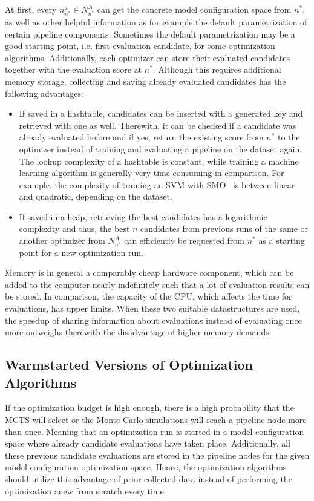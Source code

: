 At first, every $n^{a}_{n^*} \in N^A_{n^*}$ can get the concrete model configuration space from $n^*$, as well as other helpful information as for example the default parametrization of certain pipeline components.
Sometimes the default parametrization may be a good starting point, i.e. first evaluation candidate, for some optimization algorithms.\newline
Additionally, each optimizer can store their evaluated candidates together with the evaluation score at $n^*$.
Although this requires additional memory storage, collecting and saving already evaluated candidates has the following advantages:
\begin{itemize}
    \item If saved in a hashtable, candidates can be inserted with a generated key and retrieved with one as well. Therewith, it can be checked if a candidate was already evaluated before and if yes, return the existing score from $n^*$ to the optimizer instead of training and evaluating a pipeline on the dataset again.
    The lookup complexity of a hashtable is constant, while training a machine learning algorithm is generally very time consuming in comparison.
    For example, the complexity of training an SVM with SMO~\cite{Platt-SMO} is between linear and quadratic, depending on the dataset.
    \item If saved in a heap, retrieving the best candidates has a logarithmic complexity and thus, the best $n$ candidates from previous runs of the same or another optimizer from $N^A_{n^*}$ can efficiently be requested from $n^*$ as a starting point for a new optimization run.
\end{itemize}
Memory is in general a comparably cheap hardware component, which can be added to the computer nearly indefinitely such that a lot of evaluation results can be stored.
In comparison, the capacity of the CPU, which affects the time for evaluations, has upper limits.
When these two suitable datastructures are used, the speedup of sharing information about evaluations instead of evaluating once more outweighs therewith the disadvantage of higher memory demands.

\subsection{Warmstarted Versions of Optimization Algorithms}
\label{sec:approach:configuration:warmstart}
If the optimization budget is high enough, there is a high probability that the MCTS will select or the Monte-Carlo simulations will reach a pipeline node more than once.
Meaning that an optimization run is started in a model configuration space where already candidate evaluations have taken place.
Additionally, all these previous candidate evaluations are stored in the pipeline nodes for the given model configuration optimization space.
Hence, the optimization algorithms should utilize this advantage of prior collected data instead of performing the optimization anew from scratch every time.

